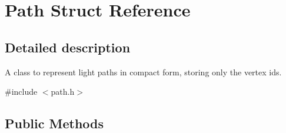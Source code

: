 \hypertarget{struct_path}{}\section{Path Struct Reference}
\label{struct_path}


\subsection{Detailed description}
A class to represent light paths in compact form, storing only the vertex ids. 

{\ttfamily \#include $<$path.\+h$>$}

\subsection*{Public Methods}
